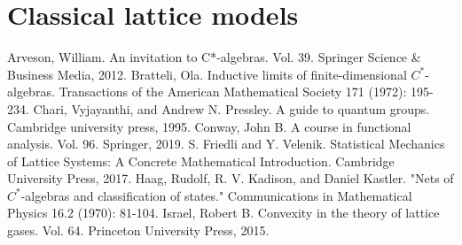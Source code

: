 \documentclass[11pt]{article}%
\theoremstyle{definition}
\theoremstyle{definition}
\theoremstyle{definition}\newtheorem{definition}{Definition}
\theoremstyle{definition} \newtheorem{cntex}{Counterexample}
\theoremstyle{definition}\newtheorem*{acknowledgement}{Acknowledgement}
\theoremstyle{definition}\newtheorem{remark}{Remark}
\theoremstyle{definition}\newtheorem{quest}{Question}
\numberwithin{equation}{section}
\begin{document}
\tableofcontents


\section{Classical lattice models}






\begin{thebibliography}{10}
 Arveson, William. An invitation to C*-algebras. Vol. 39. Springer Science \& Business Media, 2012.
 Bratteli, Ola. Inductive limits of finite-dimensional $C^*$-algebras. Transactions of the American Mathematical Society 171 (1972): 195-234.\label{bratteli}
 Chari, Vyjayanthi, and Andrew N. Pressley. A guide to quantum groups. Cambridge university press, 1995.
 Conway, John B. A course in functional analysis. Vol. 96. Springer, 2019.
 S. Friedli and Y. Velenik. Statistical Mechanics of Lattice Systems: A Concrete Mathematical Introduction. Cambridge University Press, 2017.
 Haag, Rudolf, R. V. Kadison, and Daniel Kastler. "Nets of $C^*$-algebras and classification of states." Communications in Mathematical Physics 16.2 (1970): 81-104.
 Israel, Robert B. Convexity in the theory of lattice gases. Vol. 64. Princeton University Press, 2015.
\end{thebibliography}
\end{document}
